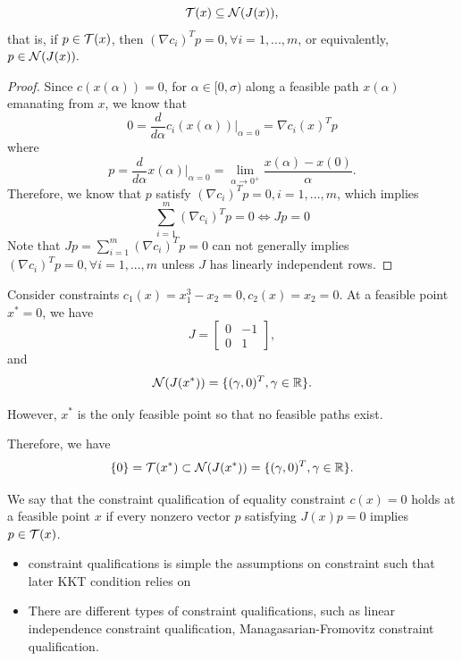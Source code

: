 \begin{refsection}
\begin{lemma}
$$\mathcal{T}(x) \subseteq \mathcal{N}(J(x)),$$
that is, if $p \in \mathcal{T}(x)$, then $(\nabla c_i)^T p = 0, \forall i=1,...,m$, or equivalently, $p \in \mathcal{N}(J(x)).$
\end{lemma}
\begin{proof}
Since $c(x(\alpha)) = 0$, for $\alpha\in [0,\sigma)$ along a feasible path $x(\alpha)$ emanating from $x$, we know that
$$ 0 = \frac{d}{d\alpha}c_i(x(\alpha))|_{\alpha = 0} = \nabla c_i(x)^T p$$
where $$p = \frac{d}{d\alpha}x(\alpha)|_{\alpha=0}=\lim_{\alpha\to 0^+}\frac{x(\alpha) - x(0)}{\alpha}.$$
Therefore, we know that $p$ satisfy $(\nabla c_i)^T p = 0,i=1,...,m$, which implies $$ \sum_{i=1}^m (\nabla c_i)^T p = 0 \Leftrightarrow Jp = 0$$
Note that $Jp = \sum_{i=1}^m (\nabla c_i)^T p = 0$ can not generally implies  $(\nabla c_i)^T p = 0, \forall i=1,...,m$ unless $J$ has linearly independent rows.
\end{proof}

\begin{example}\cite{Robinson2015nonlinear}
Consider constraints $c_1(x) = x_1^3 - x_2 = 0, c_2(x) = x_2 = 0.$ At a feasible point $x^* = 0$, we have
$$J = \begin{bmatrix}
0&-1\\
0& 1
\end{bmatrix},$$
and $$\mathcal{N}(J(x^*)) = \{(\gamma,0)^T,\gamma\in \mathbb{R}\}.$$

However, $x^*$ is the only feasible point so that no feasible paths exist. 

Therefore, we have
$$\{0\} = \mathcal{T}(x^*) \subset \mathcal{N}(J(x^*)) = \{(\gamma,0)^T,\gamma\in \mathbb{R}\}.$$
\end{example}


\begin{definition}
We say that the constraint qualification of equality constraint $c(x) = 0$ holds at a feasible point $x$ if every nonzero vector $p$ satisfying $J(x)p = 0$ implies $p \in \mathcal{T}(x)$.
\end{definition}

\begin{remark}
\begin{itemize}\hfill
    \item constraint qualifications is simple the assumptions on constraint such that later KKT condition relies on
    \item There are different types of constraint qualifications, such as linear independence constraint qualification, Managasarian-Fromovitz constraint qualification.
\end{itemize}
\end{remark}




\end{refsection}
